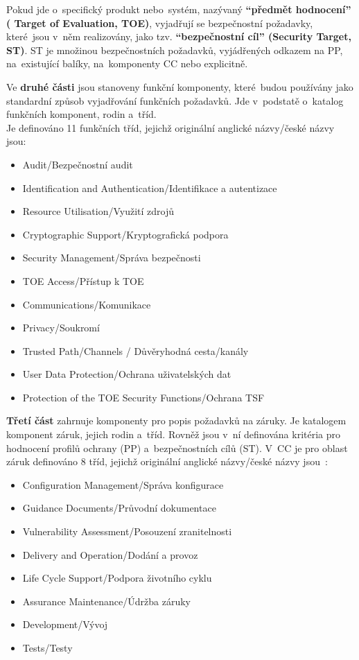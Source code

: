 \documentclass[a4paper,12pt]{article}
\renewcommand{\b}[1]{\textbf{#1}} %
\begin{document}
Pokud jde o~specifický produkt nebo~systém, nazývaný \b{“předmět hodnocení” ( Target of Evaluation, TOE)}, vyjadřují se bezpečnostní požadavky, které~jsou v~něm realizovány, jako tzv. \b{“bezpečnostní cíl” (Security Target, ST)}. ST je množinou bezpečnostních požadavků, vyjádřených odkazem na PP, na~existující balíky, na~komponenty CC nebo explicitně.~\cite{NBUHodnoceniBezpecnostiSW}

Ve \b{druhé části} jsou stanoveny funkční komponenty, které~budou používány jako standardní způsob vyjadřování funkčních požadavků. Jde v~podstatě o~katalog funkčních komponent, rodin a~tříd.~\cite{NBUHodnoceniBezpecnostiSW}\\
Je definováno 11 funkčních tříd, jejichž originální anglické názvy/české názvy jsou:
\begin{itemize}
 \item Audit/Bezpečnostní audit
 \item Identification and Authentication/Identifikace a autentizace
 \item Resource Utilisation/Využití zdrojů
 \item Cryptographic Support/Kryptografická podpora
 \item Security Management/Správa bezpečnosti
 \item TOE Access/Přístup k TOE
 \item Communications/Komunikace
 \item Privacy/Soukromí
 \item Trusted Path/Channels / Důvěryhodná cesta/kanály
 \item User Data Protection/Ochrana uživatelských dat
 \item Protection of the TOE Security Functions/Ochrana TSF
\end{itemize}

\b{Třetí část} zahrnuje komponenty pro popis požadavků na záruky. Je katalogem komponent záruk, jejich rodin a~tříd. Rovněž jsou v~ní definována kritéria pro hodnocení profilů ochrany (PP) a~bezpečnostních cílů (ST). V~CC je pro oblast záruk definováno 8 tříd, jejichž originální anglické názvy/české názvy jsou~\cite{NBUHodnoceniBezpecnostiSW}:
\begin{itemize}
 \item Configuration Management/Správa konfigurace
 \item Guidance Documents/Průvodní dokumentace
 \item Vulnerability Assessment/Posouzení zranitelnosti
 \item Delivery and Operation/Dodání a provoz
 \item Life Cycle Support/Podpora životního cyklu
 \item Assurance Maintenance/Údržba záruky
 \item Development/Vývoj
 \item Tests/Testy
\end{itemize}
\end{document}
